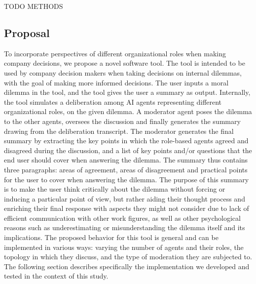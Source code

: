 \documentclass[sigconf, authorversion, nonacm, screen]{acmart}
\begin{document}
TODO METHODS

\subsection{Proposal}

To incorporate perspectives of different organizational roles when making company decisions,
we propose a novel software tool.
The tool is intended to be used by company decision makers when taking decisions on internal dilemmas,
with the goal of making more informed decisions.
The user inputs a moral dilemma in the tool, and the tool gives the user a summary as output.
Internally, the tool simulates a deliberation among AI agents representing different organizational roles, on the given dilemma.
A moderator agent poses the dilemma to the other agents, oversees the discussion and finally generates the summary drawing from the deliberation transcript.
The moderator generates the final summary by extracting the key points in which the role-based agents agreed and disagreed during the discussion, 
and a list of key points and/or questions that the end user should cover when answering the dilemma.
The summary thus contains three paragraphs: areas of agreement, areas of disagreement and practical points for the user to cover when answering the dilemma.
The purpose of this summary is to make the user think critically about the dilemma
without forcing or inducing a particular point of view, 
but rather aiding their thought process and enriching their final response 
with aspects they might not consider due to lack of efficient communication with other work figures,
as well as other psychological reasons such as underestimating or misunderstanding the dilemma itself and its implications.
The proposed behavior for this tool is general and can be implemented in various ways: varying the number of agents and their roles, the topology in which they discuss, and the type of moderation they are subjected to.
The following section describes specifically the implementation we developed and tested in the context of this study.
\end{document}
